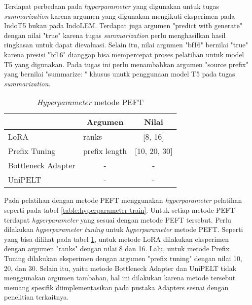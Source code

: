 Terdapat perbedaan pada \textit{hyperparameter} yang digunakan untuk tugas \textit{summarization} karena argumen yang digunakan mengikuti eksperimen pada IndoT5 bukan pada IndoLEM. Terdapat juga argumen "predict with generate" dengan nilai "true" karena tugas \textit{summarization} perlu menghasilkan hasil ringkasan untuk dapat dievaluasi. Selain itu, nilai argumen "bf16" bernilai "true" karena presisi "bf16" dianggap bisa mempercepat proses pelatihan untuk model T5 yang digunakan. Pada tugas ini perlu menambahkan argumen "source prefix" yang bernilai "summarize: " khusus unutk penggunaan model T5 pada tugas \textit{summarization}.

\begin{table}[h]
    \centering
    \caption{\textit{Hyperparameter} metode PEFT}
    \label{table:hyperparameter-PEFT}
    \begin{tabular}{|l|l|c|}
        \hline \rowcolor{black!10}
        \multicolumn{1}{|c|}{\textbf{Metode}} & \multicolumn{1}{|c|}{\textbf{Argumen}} & \textbf{Nilai} \\ \hline
        LoRA & ranks & [8, 16] \\ \hline
        Prefix Tuning & prefix length & [10, 20, 30] \\ \hline
        Bottleneck Adapter & \multicolumn{1}{|c|}{-} & - \\ \hline
        UniPELT & \multicolumn{1}{|c|}{-}  & - \\ \hline
    \end{tabular}
\end{table}

Pada pelatihan dengan metode PEFT  menggunakan \textit{hyperparameter} pelatihan seperti pada tabel \ref{table:hyperparameter-train}. Untuk setiap metode PEFT terdapat \textit{hyperparameter} yang sesuai dengan metode PEFT tersebut. Perlu dilakukan \textit{hyperparameter tuning} untuk \textit{hyperparameter} metode PEFT. Seperti yang bisa dilihat pada tabel \ref{table:hyperparameter-PEFT}, untuk metode LoRA dilakukan eksperimen dengan argumen "ranks" dengan nilai 8 dan 16. Lalu, untuk metode Prefix Tuning dilakukan eksperimen dengan argumen "prefix tuning" dengan nilai 10, 20, dan 30. Selain itu, yaitu metode Bottleneck Adapter dan UniPELT tidak menggunakan argumen tambahan, hal ini dilakukan karena metode tersebut memang spesifik diimplementasikan pada pustaka Adapters sesuai dengan penelitian terkaitnya.

